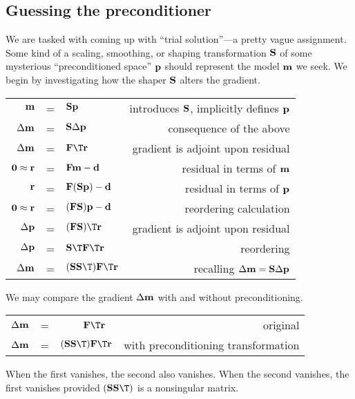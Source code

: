 \subsection{Guessing the preconditioner}
We are tasked with coming up with ``trial solution''---a pretty vague assignment.
Some kind of a scaling, smoothing, or shaping transformation $\bold S$
of some mysterious ``preconditioned space'' $\bold p$
should represent the model $\bold m$ we seek.
We begin by investigating how the shaper $\bold S$ alters the gradient.
\par
\begin{center}
\begin{tabular}{rllr}
$\bold m $&=&$ \bold S \bold p$		& introduces $\bold S$, implicitly defines $\bold p$
\\
$\Delta\bold m $&=&$ \bold S \Delta\bold p$	& consequence of the above
\\
$\Delta\bold m $&=&$ \bold F\T \bold r$ 	& gradient is adjoint upon residual
\\
$\bold 0\approx \bold r $&=&$ \bold F\bold m-\bold d$	         & residual in terms of $\bold m$
\\
$\bold r $&=&$ \bold F(\bold S\bold p) -\bold d $ 		& residual in terms of $\bold p$
\\
$\bold 0\approx \bold r $&=&$  (\bold F\bold S)\bold p-\bold d$ 		& reordering calculation
\\
$\Delta\bold p $&=&$ (\bold F\bold S)\T \bold r 	$& gradient is adjoint upon residual
\\
$\Delta\bold p $&=&$  \bold S\T\bold F\T\bold r	$&          reordering
\\
$\Delta\bold m $&=&$ (\bold S\bold S\T) \bold F\T\bold r$   & recalling $\Delta\bold m=\bold S\Delta\bold p$
\end{tabular}
\end{center}
\par
We may compare the gradient $\Delta\bold m$ with and without preconditioning.
\par
\begin{center}
\begin{tabular}{rllr}
$\Delta\bold m $&=&$ \ \quad \quad \bold F\T \bold r$ 	    & original
\\
$\Delta\bold m $&=&$ (\bold S\bold S\T) \bold F\T\bold r$   & with preconditioning transformation
\end{tabular}
\end{center}
When the first vanishes, the second also vanishes.
When the second vanishes, the first vanishes provided $ (\bold S\bold S\T)$ is a nonsingular matrix.

